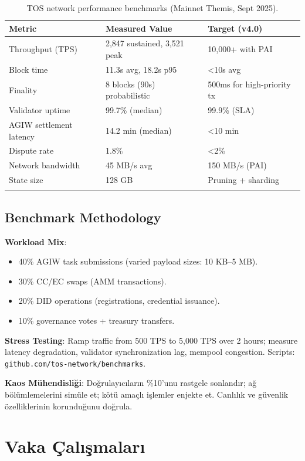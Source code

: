 \documentclass[11pt]{article}
\begin{document}
\begin{itemize}[noitemsep]
\begin{itemize}[noitemsep]
\begin{itemize}[noitemsep]
\begin{itemize}[noitemsep]
\begin{itemize}[noitemsep]
\begin{itemize}[noitemsep]
\begin{itemize}[noitemsep]
\begin{enumerate}[noitemsep]
\begin{itemize}[noitemsep]
\begin{longtable}{@{}p{}p{}p{}@{}}
\toprule
\textbf{Metric} & \textbf{Measured Value} & \textbf{Target (v4.0)} \\\midrule
Throughput (TPS) & 2,847 sustained, 3,521 peak & 10,000+ with PAI \\
Block time & 11.3s avg, 18.2s p95 & <10s avg \\
Finality & 8 blocks (90s) probabilistic & 500ms for high-priority tx \\
Validator uptime & 99.7\% (median) & 99.9\% (SLA) \\
AGIW settlement latency & 14.2 min (median) & <10 min \\
Dispute rate & 1.8\% & <2\% \\
Network bandwidth & 45 MB/s avg & 150 MB/s (PAI) \\
State size & 128 GB & Pruning + sharding \\
\bottomrule
\caption{TOS network performance benchmarks (Mainnet Themis, Sept 2025).}
\end{longtable}

\subsection{Benchmark Methodology}

\textbf{Workload Mix}:
\begin{itemize}[noitemsep]
  \item 40\% AGIW task submissions (varied payload sizes: 10 KB--5 MB).
  \item 30\% CC/EC swaps (AMM transactions).
  \item 20\% DID operations (registrations, credential issuance).
  \item 10\% governance votes + treasury transfers.
\end{itemize}

\textbf{Stress Testing}: Ramp traffic from 500 TPS to 5,000 TPS over 2 hours; measure latency degradation, validator synchronization lag, mempool congestion. Scripts: \texttt{github.com/tos-network/benchmarks}.

\textbf{Kaos Mühendisliği}: Doğrulayıcıların \%10'unu rastgele sonlandır; ağ bölümlemelerini simüle et; kötü amaçlı işlemler enjekte et. Canlılık ve güvenlik özelliklerinin korunduğunu doğrula.

\section{Vaka Çalışmaları}
\label{sec:case-studies}


\end{itemize}
\end{enumerate}
\end{itemize}
\end{itemize}
\end{itemize}
\end{itemize}
\end{itemize}
\end{itemize}
\end{itemize}
\end{document}
